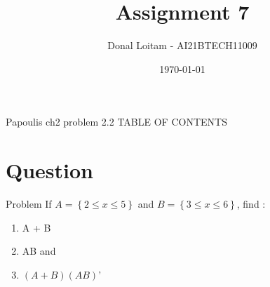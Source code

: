 \documentclass{beamer}
\title{Assignment 7}
\author{Donal Loitam - AI21BTECH11009}
\date{\today}
\providecommand{\brak}[1]{\ensuremath{\left(#1\right)}}
\providecommand{\cbrak}[1]{\ensuremath{\left\{#1\right\}}}
\begin{document}
\begin{frame}
    \titlepage 
\end{frame}

\logo{}


\begin{frame}{Papoulis ch2 problem 2.2}
TABLE OF CONTENTS
    \tableofcontents
\end{frame}


\section{Question}
\begin{frame}{Problem}
If $A = \cbrak{2 \le x \le 5}$ and $B = \cbrak{3 \le x \le 6}$, find :
\begin{enumerate}
\item A + B 
\item AB and 
\item \brak{A + B}\brak{AB}'
\end{enumerate}
\end{frame}
\end{document}
